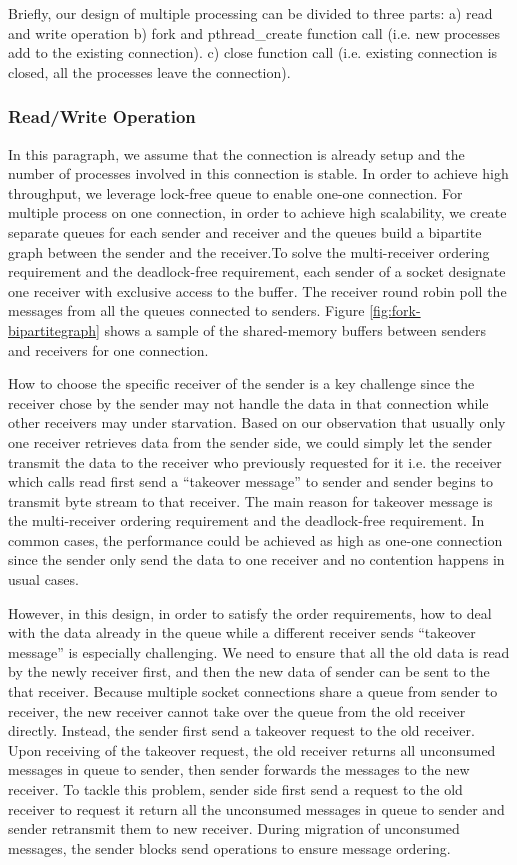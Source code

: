 Briefly, our design of multiple processing can be divided to three parts: a) read and write operation b) fork and pthread\_create function call (i.e. new processes add to the existing connection). c) close function call (i.e. existing connection is closed, all the processes leave the connection).


\subsubsection{Read/Write Operation}
\label{subsubsec:fork_rdwr}

In this paragraph, we assume that the connection is already setup and the number of processes involved in this connection is stable. In order to achieve high throughput, we leverage lock-free queue to enable one-one connection. For multiple process on one connection, in order to achieve high scalability, we create separate queues for each sender and receiver and the queues build a bipartite graph between the sender and the receiver.To solve the multi-receiver ordering requirement and the deadlock-free requirement, each sender of a socket designate one receiver with exclusive access to the buffer. The receiver round robin poll the messages from all the queues connected to senders. Figure \ref{fig:fork-bipartitegraph} shows a sample of the shared-memory buffers between senders and receivers for one connection. 

How to choose the specific receiver of the sender is a key challenge since the receiver chose by the sender may not handle the data in that connection while other receivers may under starvation. Based on our observation that usually only one receiver retrieves data from the sender side, we could simply let the sender transmit the data to the receiver who previously requested for it i.e. the receiver which calls read first send a ``takeover message'' to sender and sender begins to transmit byte stream to that receiver.  The main reason for takeover message is the multi-receiver ordering requirement and the deadlock-free requirement. In common cases, the performance could be achieved as high as one-one connection since the sender only send the data to one receiver and no contention happens in usual cases.

However, in this design, in order to satisfy the order requirements, how to deal with the data already in the queue while a different receiver sends ``takeover message'' is especially challenging.  We need to ensure that all the old data is read by the newly receiver first, and then the new data of sender can be sent to the that receiver. Because multiple socket connections share a queue from sender to receiver, the new receiver cannot take over the queue from the old receiver directly. Instead, the sender first send a takeover request to the old receiver. Upon receiving of the takeover request, the old receiver returns all unconsumed messages in queue to sender, then sender forwards the messages to the new receiver. To tackle this problem, sender side first send a request to the old receiver to request it return all the unconsumed messages in queue to sender and sender retransmit them to new receiver. During migration of unconsumed messages, the sender blocks send operations to ensure message ordering.

